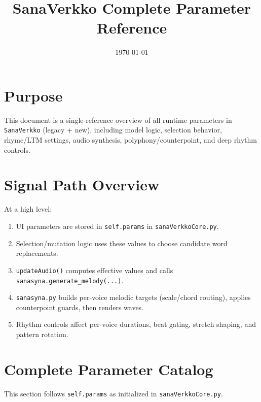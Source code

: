 \documentclass[11pt,a4paper]{article}
\title{SanaVerkko Complete Parameter Reference}
\author{}
\date{\today}
\begin{document}
\maketitle

\section{Purpose}
This document is a single-reference overview of all runtime parameters in \texttt{SanaVerkko} (legacy + new), including model logic, selection behavior, rhyme/LTM settings, audio synthesis, polyphony/counterpoint, and deep rhythm controls.

\section{Signal Path Overview}
At a high level:
\begin{enumerate}
  \item UI parameters are stored in \texttt{self.params} in \texttt{sanaVerkkoCore.py}.
  \item Selection/mutation logic uses these values to choose candidate word replacements.
  \item \texttt{updateAudio()} computes effective values and calls \texttt{sanasyna.generate\_melody(...)}.
  \item \texttt{sanasyna.py} builds per-voice melodic targets (scale/chord routing), applies counterpoint guards, then renders waves.
  \item Rhythm controls affect per-voice durations, beat gating, stretch shaping, and pattern rotation.
\end{enumerate}

\section{Complete Parameter Catalog}
This section follows \texttt{self.params} as initialized in \texttt{sanaVerkkoCore.py}.
\end{document}
